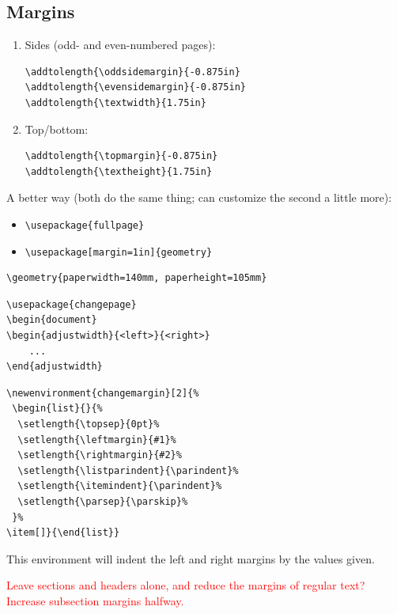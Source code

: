\documentclass{article}
\begin{document}
\subsection{Margins}
\begin{enumerate}
    \item Sides (odd- and even-numbered pages):
\begin{verbatim}
\addtolength{\oddsidemargin}{-0.875in}
\addtolength{\evensidemargin}{-0.875in}
\addtolength{\textwidth}{1.75in}
\end{verbatim}
    \item Top/bottom:
\begin{verbatim}
\addtolength{\topmargin}{-0.875in}
\addtolength{\textheight}{1.75in}
\end{verbatim}
\end{enumerate}
A better way (both do the same thing;
can customize the second a little more):
\begin{itemize}
    \item \verb|\usepackage{fullpage}|
    \item \verb|\usepackage[margin=1in]{geometry}|
\end{itemize}

\begin{verbatim}
\geometry{paperwidth=140mm, paperheight=105mm}
\end{verbatim}

\begin{verbatim}
\usepackage{changepage}
\begin{document}
\begin{adjustwidth}{<left>}{<right>}
    ...
\end{adjustwidth}
\end{verbatim}

\begin{verbatim}
\newenvironment{changemargin}[2]{%
 \begin{list}{}{%
  \setlength{\topsep}{0pt}%
  \setlength{\leftmargin}{#1}%
  \setlength{\rightmargin}{#2}%
  \setlength{\listparindent}{\parindent}%
  \setlength{\itemindent}{\parindent}%
  \setlength{\parsep}{\parskip}%
 }%
\item[]}{\end{list}}
\end{verbatim}
This environment will indent the left and right margins by the values given.

\textcolor{red}{Leave sections and headers alone, and reduce the margins of
regular text? Increase subsection margins halfway.}
\end{document}
